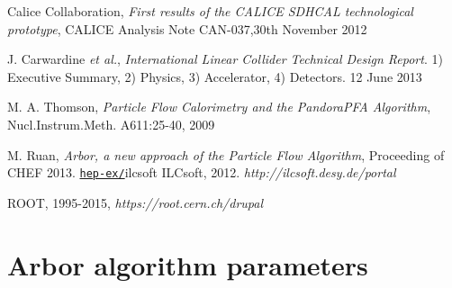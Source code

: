 \documentclass[cits]{JINST}
\begin{document}
\begin{thebibliography}{6}
\renewcommand{\hepex}[1]{\href{http://www.arxiv.org/abs/#1}{\tt hep-ex/#1}}
\renewcommand{\physics}[1]{\href{http://www.arxiv.org/abs/#1}{\tt phys.int-det/#1}}
\newcommand\nim[4]{\href{http://dx.doi.org/10.1016/#4}
  {\emph{Nucl.\ Instrum.\ Meth.} {\bf #1} (#2) #3}}



Calice Collaboration, \emph{First results of the CALICE SDHCAL technological prototype}, CALICE Analysis Note CAN-037,30th November 2012


J. Carwardine {\it et al.},  \emph{International Linear Collider Technical Design Report}. 1) Executive Summary, 2) Physics, 3) Accelerator, 4) Detectors. 12 June 2013


M. A. Thomson, \emph{Particle Flow Calorimetry and the PandoraPFA Algorithm}, Nucl.Instrum.Meth. A611:25-40, 2009


M. Ruan, \emph{Arbor, a new approach of the Particle Flow Algorithm}, Proceeding of CHEF 2013. \hepex


\bibitem{ilcsoft}
ILCsoft, 2012. \textit{http://ilcsoft.desy.de/portal}


ROOT, 1995-2015, \textit{https://root.cern.ch/drupal}

\newpage

\end{thebibliography}


\clearpage
\appendix

\section{Arbor algorithm parameters}
\label{ARBOR_ALGORITHM_PARAMETERS}
\end{document}
